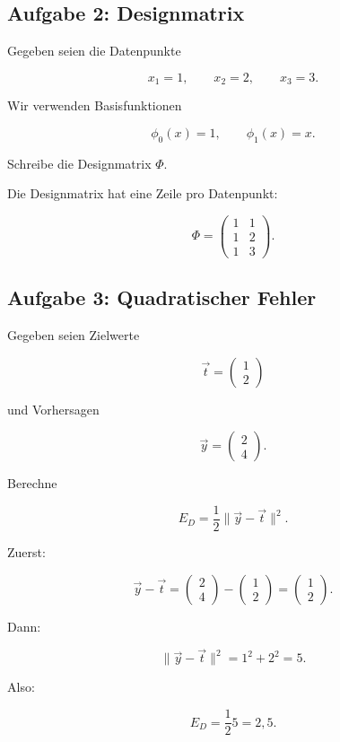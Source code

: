 \subsection{Aufgabe 2: Designmatrix}

Gegeben seien die Datenpunkte

\[
    x_1=1,
    \qquad
    x_2=2,
    \qquad
    x_3=3.
\]

Wir verwenden Basisfunktionen

\[
    \phi_0(x)=1,
    \qquad
    \phi_1(x)=x.
\]

Schreibe die Designmatrix \(\Phi\).

\begin{examplebox}
Die Designmatrix hat eine Zeile pro Datenpunkt:

\[
    \Phi
    =
    \begin{pmatrix}
        1 & 1 \\
        1 & 2 \\
        1 & 3
    \end{pmatrix}.
\]
\end{examplebox}

\subsection{Aufgabe 3: Quadratischer Fehler}

Gegeben seien Zielwerte

\[
    \vec{t}
    =
    \begin{pmatrix}
        1 \\
        2
    \end{pmatrix}
\]

und Vorhersagen

\[
    \vec{y}
    =
    \begin{pmatrix}
        2 \\
        4
    \end{pmatrix}.
\]

Berechne

\[
    E_D
    =
    \frac{1}{2}
    \|\vec{y}-\vec{t}\|^2.
\]

\begin{examplebox}
Zuerst:

\[
    \vec{y}-\vec{t}
    =
    \begin{pmatrix}
        2 \\
        4
    \end{pmatrix}
    -
    \begin{pmatrix}
        1 \\
        2
    \end{pmatrix}
    =
    \begin{pmatrix}
        1 \\
        2
    \end{pmatrix}.
\]

Dann:

\[
    \|\vec{y}-\vec{t}\|^2
    =
    1^2+2^2
    =
    5.
\]

Also:

\[
    E_D
    =
    \frac{1}{2}
    5
    =
    2{,}5.
\]
\end{examplebox}

